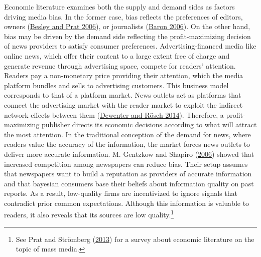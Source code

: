 \documentclass[
  12pt,
]{article}
\begin{document}
Economic literature examines both the supply and demand sides as factors
driving media bias. In the former case, bias reflects the preferences of
editors, owners (\protect\hyperlink{ref-besley_handcuffs_2006}{Besley
and Prat 2006}), or journalists
(\protect\hyperlink{ref-baron_persistent_2006}{Baron 2006}). On the
other hand, bias may be driven by the demand side reflecting the
profit-maximizing decision of news providers to satisfy consumer
preferences. Advertising-financed media like online news, which offer
their content to a large extent free of charge and generate revenue
through advertising space, compete for readers' attention. Readers pay a
non-monetary price providing their attention, which the media platform
bundles and sells to advertising customers. This business model
corresponds to that of a platform market. News outlets act as platforms
that connect the advertising market with the reader market to exploit
the indirect network effects between them
(\protect\hyperlink{ref-dewenter_einfuhrung_2014}{Dewenter and Rösch
2014}). Therefore, a profit-maximizing publisher directs its economic
decisions according to what will attract the most attention. In the
traditional conception of the demand for news, where readers value the
accuracy of the information, the market forces news outlets to deliver
more accurate information. M. Gentzkow and Shapiro
(\protect\hyperlink{ref-gentzkow_media_2006}{2006}) showed that
increased competition among newspapers can reduce bias. Their setup
assumes that newspapers want to build a reputation as providers of
accurate information and that bayesian consumers base their beliefs
about information quality on past reports. As a result, low-quality
firms are incentivized to ignore signals that contradict prior common
expectations. Although this information is valuable to readers, it also
reveals that its sources are low quality.\footnote{See Prat and
  Strömberg (\protect\hyperlink{ref-prat_political_2013}{2013}) for a
  survey about economic literature on the topic of mass media.}
\end{document}
